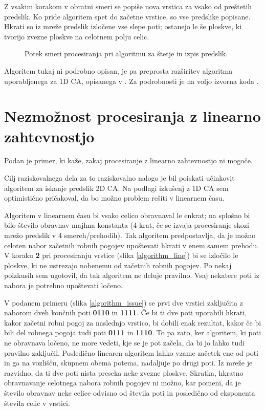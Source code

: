 \documentclass[12pt,a4paper,openany,twoside]{book}
\begin{document}
Z vsakim korakom v obratni smeri se popiše nova vrstica za vsako od preštetih predslik.
Ko pride algoritem spet do začetne vrstice, so vse predslike popisane.
Hkrati so iz mreže predslik izločene vse slepe poti; ostanejo le še ploskve,
ki tvorijo zvezne ploskve na celotnem polju celic.

\begin{figure}[htb]
\centerline{}
\caption[Algoritem za izpis predslik.]{Potek smeri procesiranja pri algoritmu za štetje in izpis predslik.}
\label{algorithm_list}
\end{figure}

Algoritem tukaj ni podrobno opisan, je pa preprosta razširitev algoritma uporabljenega
za 1D CA, opisanega v \cite{JerasDobnikar2007}. Za podrobnosti je na voljo izvorna koda \cite{Jeras2016-algirithm}.

\section{Nezmožnost procesiranja z linearno zahtevnostjo}

Podan je primer, ki kaže, zakaj procesiranje z linearno zahtevnostjo ni mogoče.

Cilj raziskovalnega dela za to raziskovalno nalogo je bil poiskati
učinkovit algoritem za iskanje predslik 2D CA. Na podlagi izkušenj z 1D CA
sem optimistično pričakoval, da bo možno problem rešiti v linearnem času.

Algoritem v linearnem času bi vsako celico obravnaval le enkrat;
na splošno bi bilo število obravnav majhna konstanta (4-krat,
če se izvaja procesiranje skozi mrežo predslik v 4 smereh/prehodih).
Tak algoritem predpostavlja, da je možno celoten nabor začetnih
robnih pogojev upoštevati hkrati v enem samem prehodu.
V koraku \textbf{2} pri procesiranju vrstice (slika \ref{algorithm_line})
bi se izločilo le ploskve, ki ne ustrezajo nobenemu od začetnih robnih pogojev.
Po nekaj poizkusih sem ugotovil, da tak algoritem ne deluje pravilno.
Vsaj nekatere poti iz nabora je potrebno upoštevati ločeno.

V podanem primeru (slika \ref{algorithm_issue}) se prvi dve vrstici zaključita z
naborom dveh končnih poti \textbf{0110} in \textbf{1111}. Če bi ti dve poti
uporabili hkrati, kakor začetni robni pogoj za naslednjo vrstico, bi dobili
enak rezultat, kakor če bi bili del robnega pogoja tudi poti \textbf{0111} in \textbf{1110}.
To pa zato, ker algoritem, ki poti ne obravnava ločeno, ne more vedeti,
kje se je pot začela, da bi jo lahko tudi pravilno zaključil.
Posledično linearen algoritem lahko vzame začetek ene od poti in ga
na vozlišču, skupnem obema potema, nadaljuje po drugi poti.
Iz mreže je razvidno, da ti dve poti nista preseka neke zvezne ploskve.
Skratka, hkratno obravnavanje celotnega nabora robnih pogojev ni možno,
kar pomeni, da je število obravnav neke celice odvisno od števila poti
in posledično od eksponenta števila celic v vrstici.
\end{document}

